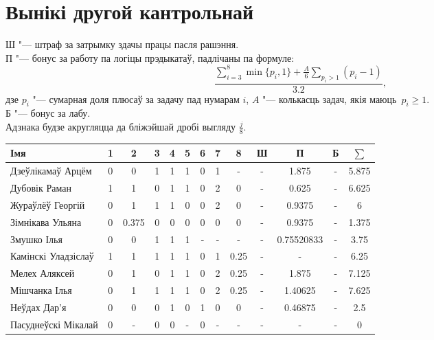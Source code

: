 \documentclass[12pt, a4paper]{extarticle}
\begin{document}
    \section{Вынікі другой кантрольнай}
    \noindent Ш "--- штраф за затрымку здачы працы пасля рашэння. \\
    П "--- бонус за работу па логіцы прэдыкатаў, падлічаны па формуле:
    $$\dfrac{\sum \limits _{i=3} ^8 \min\{p_i, 1\} + \frac{A}{6} \sum \limits _{p_i > 1} (p_i - 1)}{3.2},$$
    дзе $p_i$ "--- сумарная доля плюсаў за задачу пад нумарам $i$, $A$ "--- колькасць задач, якія маюць~$p_i \geqslant 1$. \\
    Б "--- бонус за лабу. \\
    Адзнака будзе акругляцца да бліжэйшай дробі выгляду $\frac{j}{8}$.
\begin{table}[H]
	\begin{minipage}{\textwidth}
		\begin{tabular}{|l|c|c|c|c|c|c|c|c|c|c|c|c|}
			\hline
			Імя                 &  1   & 2 & 3 &   4   &  5   & 6 &  7   &  8   &   Ш   & П &  Б   & $\sum$ \\ \hline
			Дзеўлікамаў Арцём   & 0    & 0 & 1 & 1 & 1 & 0  & 1    &  -   & -  & 1.875 & -    &  5.875 \\ \hline
			Дубовік Раман       &  1   & 1 & 0 & 1 & 1    & 0 & 2    & 0    & -     & 0.625 & -    &  6.625 \\ \hline
			Жураўлёў Георгій    &  0   & 1 & 1 & 1  & 0    & 0 & 2 & 0    & -     & 0.9375 &  -   &   6  \\ \hline
			Зімнікава Ульяна    &  0   & 0.375 & 0 & 0  & 0    & 0 & 0    & 0    &  -    & 0.9375 &  -   & 1.375 \\ \hline
			Змушко Ілья         &  0   & 0 & 1 & 1  & 1    & - & - & -    & - & 0.75520833 & - &  3.75 \\ \hline
			Камінскі Уладзіслаў &  1   & 1 & 1 &   1   &  1   & 0 &  1   &  0.25   &   -   & - &  -   &   6.25    \\ \hline
			Мелех Аляксей       &  0   & 1 & 0 & 1  & 1    & 0 & 2    & 0.25 &  -   &  1.875 & -  &   7.125  \\ \hline
			Мішчанка Ілья       &  0   & 1 & 1 & 1     & 1    & 0  & 2 & 0.25    & -  & 1.40625 & -    &   7.625    \\ \hline
			Неўдах Дар'я        &  0   & 0 & 0 & 1 & 0 & 1 & 0 & 0 & -     & 0.46875 &  -   & 2.5      \\ \hline
			Пасуднеўскі Мікалай & 0  & - & 0 &  0    &  -   & 0 &  -   &  -   &  -    & - & -    &  0  \\ \hline

\end{tabular}
\end{minipage}
\end{table}
\end{document}
